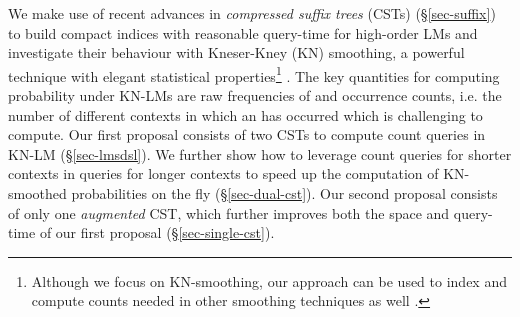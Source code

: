 %
%
%
%
 
We make use of recent advances in 
\emph{compressed suffix trees} (CSTs) \cite{nv-csurv07} (\S\ref{sec-suffix}) 
to build compact indices  
with reasonable query-time for high-order  LMs and investigate their behaviour 
with Kneser-Kney (KN) smoothing,  
a powerful technique with elegant statistical properties\footnote{Although
we focus on KN-smoothing, our approach can be used to index and compute
counts needed in other smoothing techniques as well \cite{chen1996empirical}.}  
\cite{kneser1995improved}.
% 
The key quantities for computing probability under KN-LMs
are raw frequencies of \ngrams 
and occurrence counts, i.e. the number of different contexts 
in which an \ngram has 
occurred which is challenging to compute.
%
%
Our first proposal consists of two CSTs to compute count queries 
in KN-LM (\S\ref{sec-lmsdsl}). 
% 
We further show how to leverage count queries for shorter contexts in queries for 
longer contexts to speed up the computation of KN-smoothed probabilities on the fly 
(\S\ref{sec-dual-cst}).
%
Our second proposal consists of only one \emph{augmented} CST, which 
further improves both the space and query-time of our first proposal (\S\ref{sec-single-cst}). 
% 

